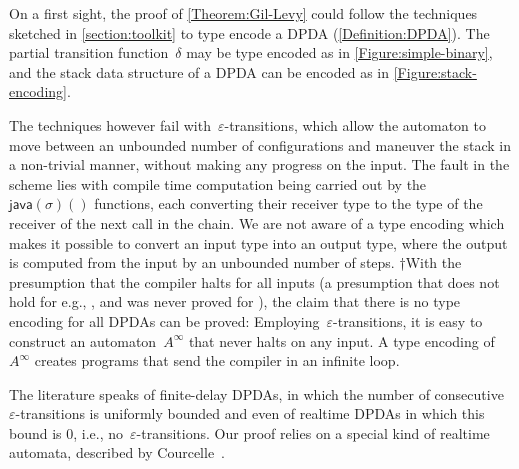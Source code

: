 On a first sight, the proof of \cref{Theorem:Gil-Levy} could follow the techniques
  sketched in \cref{section:toolkit} to type encode a DPDA (\cref{Definition:DPDA}).
The partial transition function~$δ$ may be type encoded as in \cref{Figure:simple-binary},
and the stack data structure of a DPDA can be encoded as in \cref{Figure:stack-encoding}.

The techniques however fail with~$ε$-transitions,
  which allow the automaton to move between an unbounded number of
  configurations and maneuver the stack in a non-trivial manner,
  without making any progress on the input.
The fault in the scheme lies with compile time computation being carried out
  by the~$\textsf{java}(σ)()$ functions, each converting
  their receiver type to the type of the receiver of the next call in the chain.
We are not aware of a \Java type encoding which makes
  it possible to convert an input type into an output type, where
  the output is computed from the input by an unbounded number of steps.
  †{With the presumption that the \Java compiler halts for all inputs (a presumption that does
    not hold for e.g., \CC, and was never proved for \Java), the claim that there is no \Java 
    type encoding for all DPDAs can be proved:
    Employing~$ε$-transitions, it is easy to construct an automaton~$A^∞$ that
    never halts on any input.
    A type encoding of~$A^∞$ creates programs that send the compiler in an infinite loop.
  }

The literature speaks of finite-delay DPDAs, in which the number
  of consecutive~$ε$-transitions is uniformly bounded and even of
  realtime DPDAs in which this bound is 0, i.e., no~$ε$-transitions.
Our proof relies on a special kind of realtime automata,
  described by Courcelle~\cite{Courcelle:77}.

